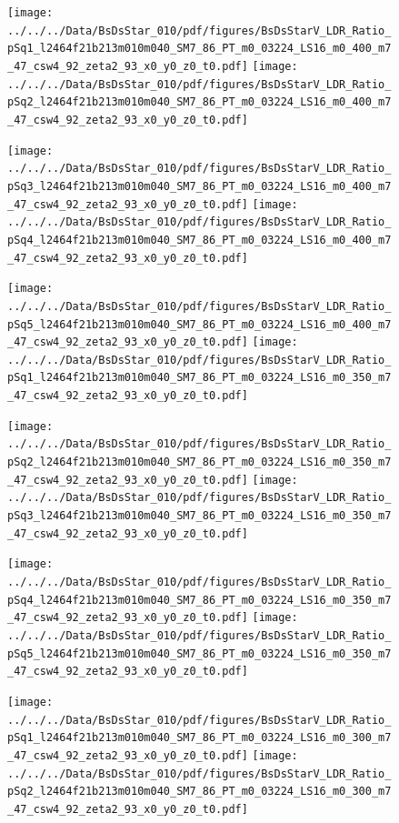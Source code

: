 \documentclass[a4paper,10pt]{article}
\begin{document}
\begin{figure}[p]
 \texttt{[image: ../../../Data/BsDsStar\_010/pdf/figures/BsDsStarV\_LDR\_Ratio\_pSq1\_l2464f21b213m010m040\_SM7\_86\_PT\_m0\_03224\_LS16\_m0\_400\_m7\_47\_csw4\_92\_zeta2\_93\_x0\_y0\_z0\_t0.pdf]} 
 \texttt{[image: ../../../Data/BsDsStar\_010/pdf/figures/BsDsStarV\_LDR\_Ratio\_pSq2\_l2464f21b213m010m040\_SM7\_86\_PT\_m0\_03224\_LS16\_m0\_400\_m7\_47\_csw4\_92\_zeta2\_93\_x0\_y0\_z0\_t0.pdf]} 
 \end{figure}
\begin{figure}[p]
 \texttt{[image: ../../../Data/BsDsStar\_010/pdf/figures/BsDsStarV\_LDR\_Ratio\_pSq3\_l2464f21b213m010m040\_SM7\_86\_PT\_m0\_03224\_LS16\_m0\_400\_m7\_47\_csw4\_92\_zeta2\_93\_x0\_y0\_z0\_t0.pdf]} 
 \texttt{[image: ../../../Data/BsDsStar\_010/pdf/figures/BsDsStarV\_LDR\_Ratio\_pSq4\_l2464f21b213m010m040\_SM7\_86\_PT\_m0\_03224\_LS16\_m0\_400\_m7\_47\_csw4\_92\_zeta2\_93\_x0\_y0\_z0\_t0.pdf]} 
 \end{figure}
\begin{figure}[p]
 \texttt{[image: ../../../Data/BsDsStar\_010/pdf/figures/BsDsStarV\_LDR\_Ratio\_pSq5\_l2464f21b213m010m040\_SM7\_86\_PT\_m0\_03224\_LS16\_m0\_400\_m7\_47\_csw4\_92\_zeta2\_93\_x0\_y0\_z0\_t0.pdf]} 
 \texttt{[image: ../../../Data/BsDsStar\_010/pdf/figures/BsDsStarV\_LDR\_Ratio\_pSq1\_l2464f21b213m010m040\_SM7\_86\_PT\_m0\_03224\_LS16\_m0\_350\_m7\_47\_csw4\_92\_zeta2\_93\_x0\_y0\_z0\_t0.pdf]} 
 \end{figure}
\clearpage
\begin{figure}[p]
 \texttt{[image: ../../../Data/BsDsStar\_010/pdf/figures/BsDsStarV\_LDR\_Ratio\_pSq2\_l2464f21b213m010m040\_SM7\_86\_PT\_m0\_03224\_LS16\_m0\_350\_m7\_47\_csw4\_92\_zeta2\_93\_x0\_y0\_z0\_t0.pdf]} 
 \texttt{[image: ../../../Data/BsDsStar\_010/pdf/figures/BsDsStarV\_LDR\_Ratio\_pSq3\_l2464f21b213m010m040\_SM7\_86\_PT\_m0\_03224\_LS16\_m0\_350\_m7\_47\_csw4\_92\_zeta2\_93\_x0\_y0\_z0\_t0.pdf]} 
 \end{figure}
\begin{figure}[p]
 \texttt{[image: ../../../Data/BsDsStar\_010/pdf/figures/BsDsStarV\_LDR\_Ratio\_pSq4\_l2464f21b213m010m040\_SM7\_86\_PT\_m0\_03224\_LS16\_m0\_350\_m7\_47\_csw4\_92\_zeta2\_93\_x0\_y0\_z0\_t0.pdf]} 
 \texttt{[image: ../../../Data/BsDsStar\_010/pdf/figures/BsDsStarV\_LDR\_Ratio\_pSq5\_l2464f21b213m010m040\_SM7\_86\_PT\_m0\_03224\_LS16\_m0\_350\_m7\_47\_csw4\_92\_zeta2\_93\_x0\_y0\_z0\_t0.pdf]} 
 \end{figure}
\begin{figure}[p]
 \texttt{[image: ../../../Data/BsDsStar\_010/pdf/figures/BsDsStarV\_LDR\_Ratio\_pSq1\_l2464f21b213m010m040\_SM7\_86\_PT\_m0\_03224\_LS16\_m0\_300\_m7\_47\_csw4\_92\_zeta2\_93\_x0\_y0\_z0\_t0.pdf]} 
 \texttt{[image: ../../../Data/BsDsStar\_010/pdf/figures/BsDsStarV\_LDR\_Ratio\_pSq2\_l2464f21b213m010m040\_SM7\_86\_PT\_m0\_03224\_LS16\_m0\_300\_m7\_47\_csw4\_92\_zeta2\_93\_x0\_y0\_z0\_t0.pdf]} 
 \end{figure}
\end{document}
